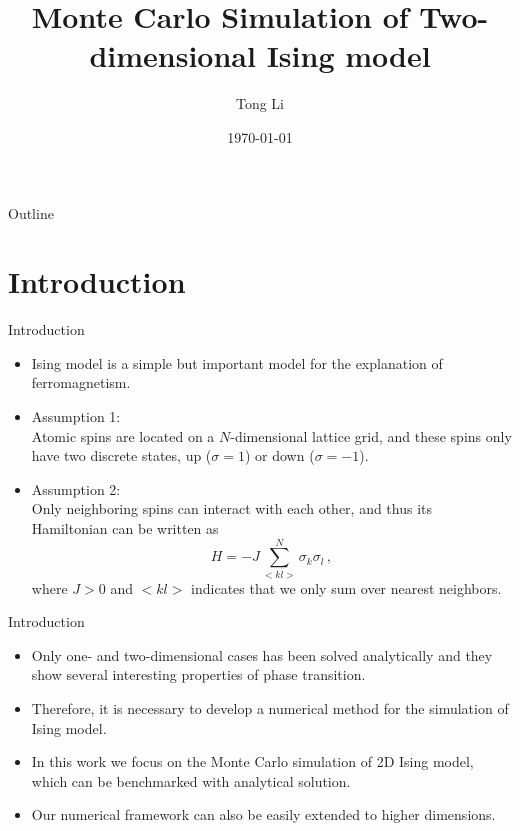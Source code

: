 \documentclass{beamer}
\title{Monte Carlo Simulation of Two-dimensional Ising model}
\author{Tong Li}
\institute{Department of Physics \& Astronomy \\ Michigan State University }
\date{\today}
\begin{document}
\beamertemplatenavigationsymbolsempty

\thispagestyle{empty} 
\begin{frame}
\titlepage
\end{frame}

\begin{frame}{Outline}
\tableofcontents
\end{frame} 

\section{Introduction}	
\begin{frame}{Introduction}
\begin{itemize}
	\item <1-> Ising model is a simple but important model for the explanation of ferromagnetism.  
	\item <2-> Assumption 1: \\
	Atomic spins are located on a $N$-dimensional lattice grid, 
	and these spins only have two discrete states, up ($\sigma=1$) or down ($\sigma=-1$). 
	\item <3-> Assumption 2: \\
	Only neighboring spins can interact with each other, and thus its Hamiltonian can be written as 
	\begin{equation}\label{eq:hamiltonian}
	H=-J\sum_{<kl>}^{N}\sigma_k\sigma_l\,, 
	\end{equation}
	where $J>0$ and $<kl>$ indicates that we only sum over nearest neighbors. 
\end{itemize}
\end{frame}

\begin{frame}{Introduction}
\begin{itemize}
	\item <1-> Only one- and two-dimensional cases has been solved analytically and they show several interesting properties of phase transition. 
	\item <1-> Therefore, it is necessary to develop a numerical method for the simulation of Ising model. 
	\item <2-> In this work we focus on the Monte Carlo simulation of 2D Ising model, which can be benchmarked with analytical solution. 
	\item <3-> Our numerical framework can also be easily extended to higher dimensions. 
\end{itemize}
\end{frame}
\end{document}
